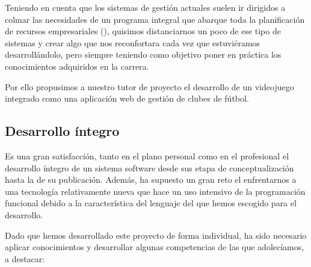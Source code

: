 Teniendo en cuenta que los sistemas de gestión actuales suelen ir dirigidos a
colmar las necesidades de un programa integral que abarque toda la planificación
de recursos empresariales (), quisimos distanciarnos un poco de ese
tipo de sistemas y crear algo que nos reconfortara cada vez que estuviéramos
desarrollándolo, pero siempre teniendo como objetivo poner en práctica los
conocimientos adquiridos en la carrera.

Por ello propusimos a nuestro tutor de proyecto el desarrollo de un videojuego
integrado como una aplicación web de gestión de clubes de fútbol.

\subsection{Desarrollo íntegro}
Es una gran satisfacción, tanto en el plano personal como en el profesional el
desarrollo íntegro de un sistema software desde sus etapa de conceptualización
hasta la de su publicación. Además, ha supuesto un gran reto el enfrentarnos a
una tecnología relativamente nueva que hace un uso intensivo de la programación
funcional debido a la característica del lenguaje del  que
hemos escogido para el desarrollo.

Dado que hemos desarrollado este proyecto de forma individual, ha sido necesario
aplicar conocimientos y desarrollar algunas competencias de las que adolecíamos,
a destacar:

